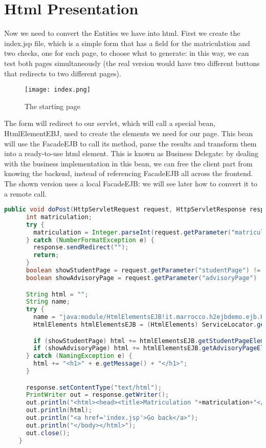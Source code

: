 \pagebreak
\section{Html Presentation}
Now we need to convert the Entities we have into html.
First we create the index.jsp file, which is a simple form that has a field for the matriculation and two checks, one for each page, to choose what to generate: in this way, we can test both pages simultaneously (the real version would have two different buttons that redirects to two different pages).

\begin{figure}[H]
  \centering
  \texttt{[image: index.png]}
  \caption{The starting page}
\end{figure}

The form will redirect to our servlet, which will call a special bean, HtmlElementEBJ, used to create the elements we need for our page. This bean will use the FacadeEJB to call its method, parse the results and transform them into a ready-to-use html element. This is known as Business Delegate: by dealing with the business implementation in this bean, we can free the client part from knowing the backend, instead of referencing FacadeEJB all across the frontend. The shown version uses a local FacadeEJB: we will see later how to convert it to a remote call.

\begin{lstlisting}[language=java, caption={Servlet doPost}]
    public void doPost(HttpServletRequest request, HttpServletResponse response) throws IOException {
      int matriculation;
      try {
        matriculation = Integer.parseInt(request.getParameter("matriculation"));
      } catch (NumberFormatException e) {
        response.sendRedirect("");
        return;
      }
      boolean showStudentPage = request.getParameter("studentPage") != null;
      boolean showAdvisoryPage = request.getParameter("advisoryPage") != null;

      String html = "";
      String name;
      try {
        name = "java:module/HtmlElementsEJB!it.marrocco.h2ejbdemo.ejb.HtmlElements";
        HtmlElements htmlElementsEJB = (HtmlElements) ServiceLocator.getService(name);

        if (showStudentPage) html += htmlElementsEJB.getStudentPageElement(matriculation);
        if (showAdvisoryPage) html += htmlElementsEJB.getAdvisoryPageElement(matriculation);
      } catch (NamingException e) {
        html += "<h1>" + e.getMessage() + "</h1>";
      }

      response.setContentType("text/html");
      PrintWriter out = response.getWriter();
      out.println("<html><head><title>Matriculation "+matriculation+"</title></head><body>");
      out.println(html);
      out.println("<a href='index.jsp'>Go back</a>");
      out.println("</body></html>");
      out.close();
    }
  \end{lstlisting}

